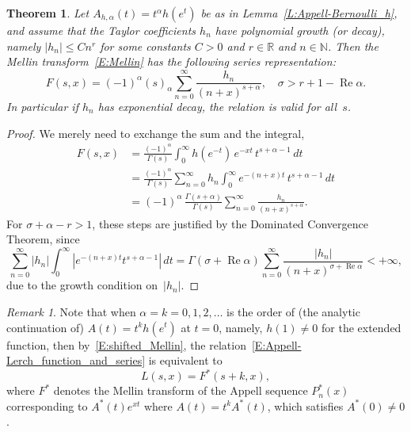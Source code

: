 \documentclass[11pt,a4paper]{amsart}
\newcommand{\N}{\mathbb{N}}
\newcommand{\R}{\mathbb{R}}
\renewcommand{\Re}{\operatorname{Re}}
\newcommand{\pochhammer}[2]{(#1)_{#2}}
\theoremstyle{plain}
\newtheorem{theorem}{Theorem}
\theoremstyle{plain}
\theoremstyle{definition}
\theoremstyle{remark}
\newtheorem*{remark}{Remark}
\begin{document}
\begin{theorem}
\label{T:specific_Appell-Lerch_relation} 
Let $A_{h,\alpha}(t) = t^{\alpha} h(e^{t})$ be as in Lemma~\ref{L:Appell-Bernoulli_h}, and assume that the Taylor coefficients $h_{n}$ have polynomial growth (or decay), namely $|h_{n}| \leq C n^{r}$ for some constants $C > 0$ and $r \in \R$ and $n \in \N$. Then the Mellin transform~\eqref{E:Mellin} has the following series representation:
\begin{equation}
\label{E:Appell-Lerch_function_and_series}
	F(s,x) = (-1)^\alpha \pochhammer{s}{\alpha} \sum_{n=0}^\infty \frac{h_{n}}{(n + x)^{s+\alpha}},
	\quad \sigma> r + 1 - \Re \alpha.
\end{equation}
In particular if $h_{n}$ has exponential decay, the relation is valid for all~$s$.
\end{theorem}



\begin{proof}
We merely need to exchange the sum and the integral,
\begin{align*}
  F(s,x) &= \frac{(-1)^\alpha}{\Gamma(s)}\int_{0}^{\infty} h(e^{-t})\,e^{-xt}\,t^{s+\alpha-1}\,dt
\\
  &=\frac{(-1)^\alpha}{\Gamma(s)}\sum_{n=0}^\infty h_{n} \int_{0}^{\infty} e^{-(n + x)t}\,t^{s+\alpha-1}\,dt
\\
  &= (-1)^\alpha \, \frac{\Gamma(s+\alpha)}{\Gamma(s)}\sum_{n=0}^\infty \frac{h_{n}}{(n + x)^{s+\alpha}}.
\end{align*}
For $\sigma+\alpha-r>1$, these steps are justified by the Dominated Convergence Theorem, since
\[
    \sum_{n=0}^\infty |h_{n}| \int_{0}^{\infty} \left|e^{-(n + x)t} t^{s+\alpha-1}\right|\,dt
  = \Gamma(\sigma + \Re \alpha)
    \sum_{n=0}^\infty \frac{|h_{n}|}{(n + x)^{\sigma+ \Re \alpha}}<+\infty,
\]
due to the growth condition on~$|h_{n}|$.
\end{proof}


\begin{remark}
Note that when $\alpha = k = 0,1,2,\dots$ is the order of (the analytic continuation of) $A(t) = t^{k} h(e^{t})$ at $t = 0$, namely, $h(1) \neq 0$ for the extended function, then by~\eqref{E:shifted_Mellin}, the relation~\eqref{E:Appell-Lerch_function_and_series} is equivalent to
\[
	L(s,x) = F^{*}(s+k,x),
\]
where $F^{*}$ denotes the Mellin transform of the Appell sequence $P_{n}^{*}(x)$ corresponding to $A^{*}(t) e^{xt}$ where $A(t) = t^{k} A^{*}(t)$, which satisfies $A^{*}(0) \neq 0$.
\end{remark}
\end{document}
